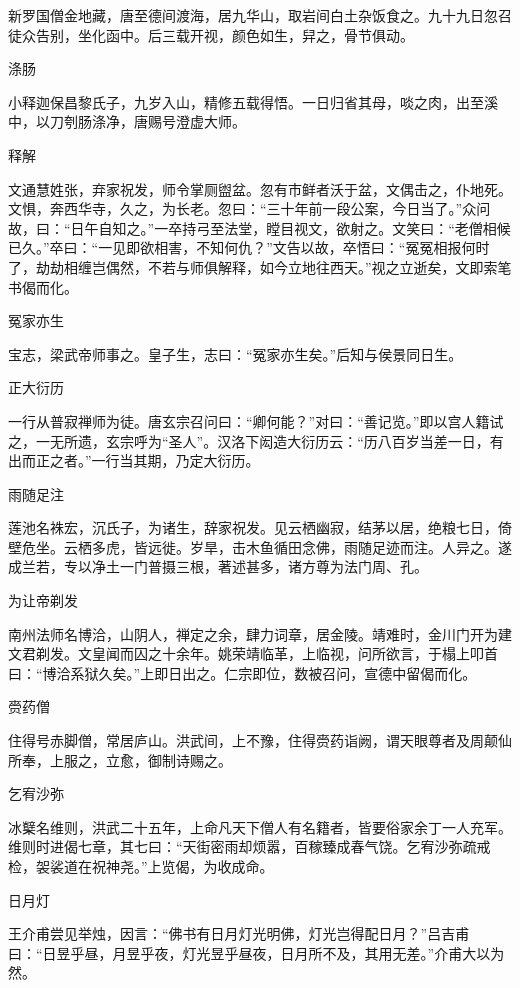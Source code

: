 \documentclass[a4paper,12pt,UTF8,twoside]{ctexbook}
\begin{document}
    新罗国僧金地藏，唐至德间渡海，居九华山，取岩间白土杂饭食之。九十九日忽召徒众告别，坐化函中。后三载开视，颜色如生，舁之，骨节俱动。
    
    涤肠
    
    小释迦保昌黎氏子，九岁入山，精修五载得悟。一日归省其母，啖之肉，出至溪中，以刀刳肠涤净，唐赐号澄虚大师。
    
    释解
    
    文通慧姓张，弃家祝发，师令掌厕盥盆。忽有市鲜者沃于盆，文偶击之，仆地死。文惧，奔西华寺，久之，为长老。忽曰：“三十年前一段公案，今日当了。”众问故，曰：“日午自知之。”一卒持弓至法堂，瞠目视文，欲射之。文笑曰：“老僧相候已久。”卒曰：“一见即欲相害，不知何仇？”文告以故，卒悟曰：“冤冤相报何时了，劫劫相缠岂偶然，不若与师俱解释，如今立地往西天。”视之立逝矣，文即索笔书偈而化。
    
    冤家亦生
    
    宝志，梁武帝师事之。皇子生，志曰：“冤家亦生矣。”后知与侯景同日生。
    
    正大衍历
    
    一行从普寂禅师为徒。唐玄宗召问曰：“卿何能？”对曰：“善记览。”即以宫人籍试之，一无所遗，玄宗呼为“圣人”。汉洛下闳造大衍历云：“历八百岁当差一日，有出而正之者。”一行当其期，乃定大衍历。
    
    雨随足注
    
    莲池名袾宏，沉氏子，为诸生，辞家祝发。见云栖幽寂，结茅以居，绝粮七日，倚壁危坐。云栖多虎，皆远徙。岁旱，击木鱼循田念佛，雨随足迹而注。人异之。遂成兰若，专以净土一门普摄三根，著述甚多，诸方尊为法门周、孔。
    
    为让帝剃发
    
    南州法师名博洽，山阴人，禅定之余，肆力词章，居金陵。靖难时，金川门开为建文君剃发。文皇闻而囚之十余年。姚荣靖临革，上临视，问所欲言，于榻上叩首曰：“博洽系狱久矣。”上即日出之。仁宗即位，数被召问，宣德中留偈而化。
    
    赍药僧
    
    住得号赤脚僧，常居庐山。洪武间，上不豫，住得赍药诣阙，谓天眼尊者及周颠仙所奉，上服之，立愈，御制诗赐之。
    
    乞宥沙弥
    
    冰櫱名维则，洪武二十五年，上命凡天下僧人有名籍者，皆要俗家余丁一人充军。维则时进偈七章，其七曰：“天街密雨却烦嚣，百稼臻成春气饶。乞宥沙弥疏戒检，袈裟道在祝神尧。”上览偈，为收成命。
    
    日月灯
    
    王介甫尝见举烛，因言：“佛书有日月灯光明佛，灯光岂得配日月？”吕吉甫曰：“日昱乎昼，月昱乎夜，灯光昱乎昼夜，日月所不及，其用无差。”介甫大以为然。
    
\end{document}
